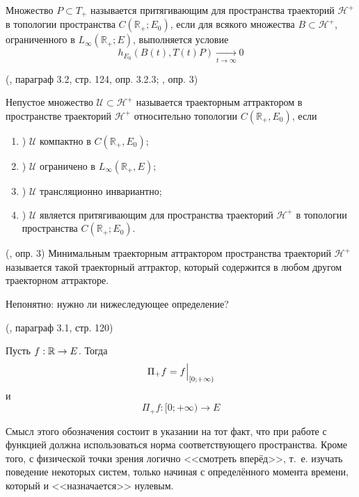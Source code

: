 Множество $P \subset T_+$ называется притягивающим для пространства траекторий $\mathcal{H}^+$ в топологии пространства $C(\mathbb{R}_+; E_0)$,
если для всякого множества $B \subset \mathcal{H}^+$, ограниченного в $L_{\infty}(\mathbb{R}_+;E)$, выполняется условие
\begin{equation}
	h_{E_0}(B(t),T(t)P) \xrightarrow[t\to\infty]{}0
\end{equation}


\opred (\cite{Zelenaya}, параграф 3.2, стр. 124, опр. 3.2.3; \cite{zhidkosti_s_pamyatyu}, опр. 3)

Непустое множество $\mathcal{U}\subset\mathcal{H}^+$ называется траекторным аттрактором в пространстве траекторий $\mathcal{H}^+$ относительно топологии $C(\mathbb{R}_+,E_0)$, если
\begin{enumerate}
	\item)
		$\mathcal{U}$ компактно в $C(\mathbb{R}_+,E_0)$;
	\item)
		$\mathcal{U}$ ограничено в $L_{\infty}(\mathbb{R}_+,E)$;
	\item)
		$\mathcal{U}$ трансляционно инвариантно;
	\item)
		$\mathcal{U}$ является притягивающим для пространства траекторий $\mathcal{H}^+$ в топологии пространства $C(\mathbb{R}_+; E_0)$.
\end{enumerate}

\opred (\cite{zhidkosti_s_pamyatyu}, опр. 3)
Минимальным траекторным аттрактором пространства траекторий $\mathcal{H}^+$ называется такой траекторный аттрактор, который содержится в любом другом траекторном аттракторе.



Непонятно: нужно ли нижеследующее определение?

\opred (\cite{Zelenaya}, параграф 3.1, стр. 120)

Пусть $f:\mathbb{R}\to E$.
Тогда
$$
	\Pi_+f = \Bigl. f \Bigr|_{[0;+\infty)}
$$
и
$$
	\Pi_+f:[0; +\infty) \to E
$$

Смысл этого обозначения состоит в указании на тот факт, что при работе с функцией должна использоваться норма соответствующего пространства.
Кроме того, с физической точки зрения логично <<смотреть вперёд>>, т.~е. изучать поведение некоторых систем, только начиная с определённого момента времени, который и <<назначается>> нулевым.

